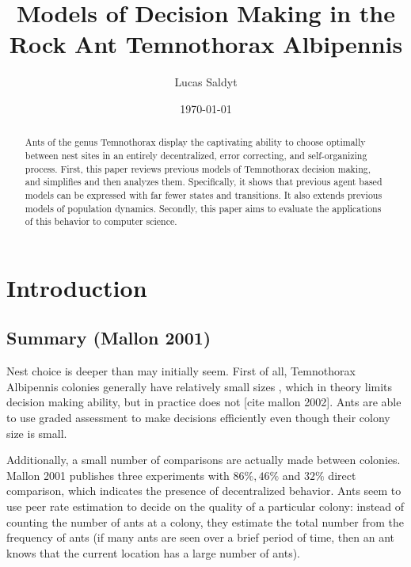 \documentclass[letterpaper]{article}
\title{Models of Decision Making in the Rock Ant Temnothorax Albipennis}
\date{\today}
\author{Lucas Saldyt}
\begin{document}
\maketitle

\begin{abstract}
    Ants of the genus Temnothorax display the captivating ability to choose optimally between nest sites in an entirely decentralized, error correcting, and self-organizing process.
    First, this paper reviews previous models of Temnothorax decision making, and simplifies and then analyzes them.
    Specifically, it shows that previous agent based models can be expressed with far fewer states and transitions. 
    It also extends previous models of population dynamics.
    Secondly, this paper aims to evaluate the applications of this behavior to computer science.
\end{abstract}

\section{Introduction}


\subsection{Summary (Mallon 2001)}

Nest choice is deeper than may initially seem.
First of all, Temnothorax Albipennis colonies generally have relatively small sizes , which in theory limits decision making ability, but in practice does not [cite mallon 2002]. 
Ants are able to use graded assessment to make decisions efficiently even though their colony size is small.

Additionally, a small number of comparisons are actually made between colonies. 
Mallon 2001 publishes three experiments with $86\%, 46\%$ and $32\%$ direct comparison, which indicates the presence of decentralized behavior.
Ants seem to use peer rate estimation to decide on the quality of a particular colony: instead of counting the number of ants at a colony, they estimate the total number from the frequency of ants (if many ants are seen over a brief period of time, then an ant knows that the current location has a large number of ants).
\end{document}
